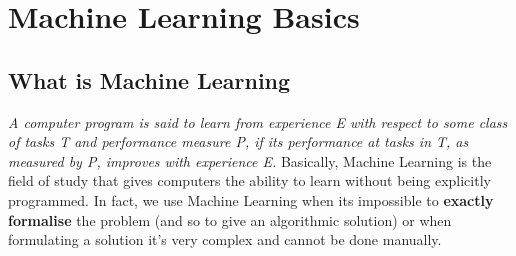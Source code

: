 \chapter{Machine Learning Basics}
\section{What is Machine Learning}
\textit{A computer program is said to learn from experience E with respect to some class of tasks T and performance measure P, if its performance at tasks in T, as measured by P, improves with experience E.} Basically, Machine Learning is the field of study that gives computers the ability to learn without being explicitly programmed. In fact, we use Machine Learning when its impossible to \textbf{exactly formalise} the problem (and so to give an algorithmic solution) or when formulating a solution it's very complex and cannot be done manually.
